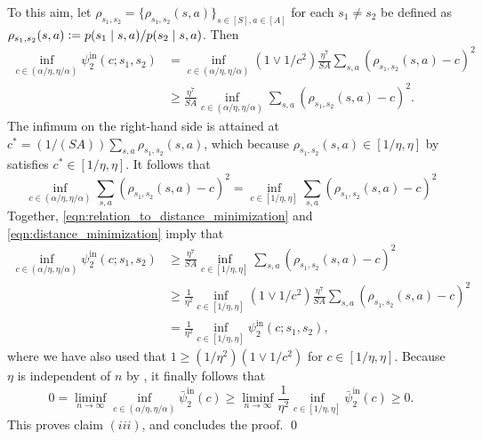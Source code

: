 \documentclass[11pt]{article}
\newcommand{\eqdef}{\vcentcolon=}
\theoremstyle{definition}
\theoremstyle{definition}
\begin{document}
To this aim, let $\rho_{s_1,s_2}=\{\rho_{s_1,s_2}(s,a)\}_{s\in[S],a\in[A]}$ for each $s_1\neq s_2$ be defined as $\rho_{s_1,s_2}(s,a)\eqdef p(s_1\mid s,a)/p(s_2\mid s,a)$.
Then
\begin{equation}
	\label{eqn:relation_to_distance_minimization}
	\begin{split}
		\inf_{c\in(\alpha/\eta,\eta/\alpha)}\psi_2^{\mathrm{in}}(c;s_1,s_2)
		 &
		=
		\inf_{c\in(\alpha/\eta,\eta/\alpha)}(1\vee 1/c^2)\frac{\eta^7}{SA}\sum_{s,a}(\rho_{s_1,s_2}(s,a)-c)^2
		\\
		 &
		\geq
		\frac{\eta^7}{SA}\inf_{c\in(\alpha/\eta,\eta/\alpha)}\sum_{s,a}(\rho_{s_1,s_2}(s,a)-c)^2.
	\end{split}
\end{equation}
The infimum on the right-hand side is attained at $c^* = (1/(SA))\sum_{s,a}\rho_{s_1,s_2}(s,a)$, which because $\rho_{s_1,s_2}(s,a)\in [1/\eta,\eta]$ by  satisfies $c^*\in [1/\eta,\eta]$.
It follows that
\begin{equation}
	\label{eqn:distance_minimization}
	\inf_{c\in(\alpha/\eta,\eta/\alpha)}\sum_{s,a}(\rho_{s_1,s_2}(s,a)-c)^2
	=
	\inf_{c\in[1/\eta,\eta]}\sum_{s,a}(\rho_{s_1,s_2}(s,a)-c)^2
\end{equation}
Together, \eqref{eqn:relation_to_distance_minimization} and \eqref{eqn:distance_minimization} imply that
\begin{equation}
	\begin{split}
		\inf_{c\in(\alpha/\eta,\eta/\alpha)}\psi_2^{\mathrm{in}}(c;s_1,s_2)
		 &
		\geq
		\frac{\eta^7}{SA}\inf_{c\in[1/\eta,\eta]}\sum_{s,a}(\rho_{s_1,s_2}(s,a)-c)^2
		\\
		 &
		\geq
		\frac{1}{\eta^2}\inf_{c\in[1/\eta,\eta]}(1\vee 1/c^2)\frac{\eta^7}{SA}\sum_{s,a}(\rho_{s_1,s_2}(s,a)-c)^2
		\\
		 &
		=
		\frac{1}{\eta^2}\inf_{c\in[1/\eta,\eta]}\psi_2^{\mathrm{in}}(c;s_1,s_2)
		,
	\end{split}
\end{equation}
where we have also used that $1\geq (1/\eta^2)(1\vee 1/c^2)$ for $c\in[1/\eta,\eta]$.
Because $\eta$ is independent of $n$ by , it finally follows that
\begin{equation}
	0
	=
	\liminf_{n\rightarrow\infty}\inf_{c\in(\alpha/\eta,\eta/\alpha)}\bar{\psi}_2^{\mathrm{in}}(c)
	\geq
	\liminf_{n\rightarrow\infty}\frac{1}{\eta^2}\inf_{c\in[1/\eta,\eta]}\bar{\psi}_2^{\mathrm{in}}(c)
	\geq
	0
	.
\end{equation}
This proves claim $(iii)$, and concludes the proof.
\qed
\end{document}
